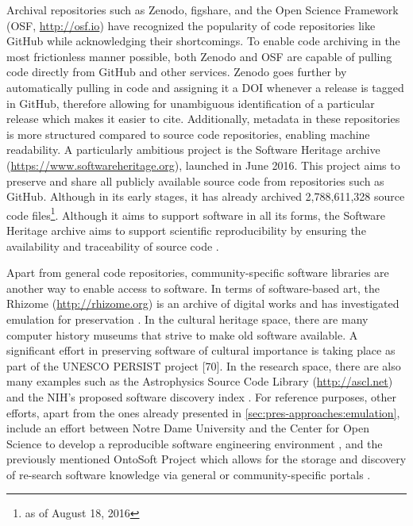 \documentclass[letterpaper,11pt]{article}
\begin{document}
Archival repositories such as Zenodo, figshare, and the Open Science Framework (OSF, \url{http://osf.io}) have recognized the popularity of code repositories like GitHub while acknowledging their shortcomings. To enable code archiving in the most frictionless manner possible, both Zenodo and OSF are capable of pulling code directly from GitHub and other services. Zenodo goes further by automatically pulling in code and assigning it a DOI whenever a release is tagged in GitHub, therefore allowing for unambiguous identification of a particular release which makes it easier to cite. Additionally, metadata in these repositories is more structured compared to source code repositories, enabling machine readability. A particularly ambitious project is the Software Heritage archive (\url{https://www.softwareheritage.org}), launched in June 2016. This project aims to preserve and share all publicly available source code from repositories such as GitHub. Although in its early stages, it has already archived 2,788,611,328 source code files\footnote{as of August 18, 2016}. Although it aims to support software in all its forms, the Software Heritage archive aims to support scientific reproducibility by ensuring the availability and traceability of source code \citep{softwareheritage2016_mission}.

Apart from general code repositories, community-specific software libraries are another way to enable access to software. In terms of software-based art, the Rhizome (\url{http://rhizome.org}) is an archive of digital works and has investigated emulation for preservation \citep{mckeehan2016}. In the cultural heritage space, there are many computer history museums that strive to make old software available. A significant effort in preserving software of cultural importance is taking place as part of the UNESCO PERSIST project [70]. In the research space, there are also many examples such as the Astrophysics Source Code Library (\url{http://ascl.net}) and the NIH’s proposed software discovery index \citep{bonazzi2015}. For reference purposes, other efforts, apart from the ones already presented in \cref{sec:pres-approaches:emulation}, include an effort between Notre Dame University and the Center for Open Science to develop a reproducible software engineering environment \citep{centeropenscience2016}, and the previously mentioned OntoSoft Project which allows for the storage and discovery of re-search software knowledge via general or community-specific portals \citep{gil2015}. 
\end{document}
